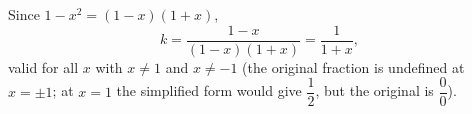 Since $1-x^2=(1-x)(1+x)$,
\[
k=\dfrac{1-x}{(1-x)(1+x)}=\boxed{\dfrac{1}{1+x}},
\]
valid for all $x$ with $x\ne1$ and $x\ne-1$ (the original fraction is undefined at $x=\pm1$; at $x=1$ the simplified form would give $\dfrac{1}{2}$, but the original is $\dfrac{0}{0}$).
